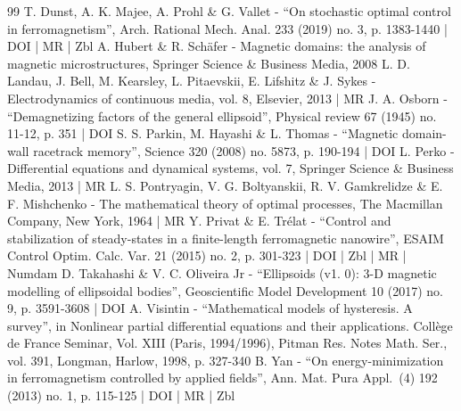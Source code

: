 \begin{thebibliography}{99}
T. Dunst, A. K. Majee, A. Prohl \& G. Vallet - “On stochastic optimal control in ferromagnetism”, Arch. Rational Mech. Anal. 233 (2019) no. 3, p. 1383-1440 | DOI | MR | Zbl
A. Hubert \& R. Schäfer - Magnetic domains: the analysis of magnetic microstructures, Springer Science \& Business Media, 2008
L. D. Landau, J. Bell, M. Kearsley, L. Pitaevskii, E. Lifshitz \& J. Sykes - Electrodynamics of continuous media, vol. 8, Elsevier, 2013 | MR
J. A. Osborn - “Demagnetizing factors of the general ellipsoid”, Physical review 67 (1945) no. 11-12, p. 351 | DOI
S. S. Parkin, M. Hayashi \& L. Thomas - “Magnetic domain-wall racetrack memory”, Science 320 (2008) no. 5873, p. 190-194 | DOI
L. Perko - Differential equations and dynamical systems, vol. 7, Springer Science \& Business Media, 2013 | MR
L. S. Pontryagin, V. G. Boltyanskii, R. V. Gamkrelidze \& E. F. Mishchenko - The mathematical theory of optimal processes, The Macmillan Company, New York, 1964 | MR
Y. Privat \& E. Trélat - “Control and stabilization of steady-states in a finite-length ferromagnetic nanowire”, ESAIM Control Optim. Calc. Var. 21 (2015) no. 2, p. 301-323 | DOI | Zbl | MR | Numdam
D. Takahashi \& V. C. Oliveira Jr - “Ellipsoids (v1. 0): 3-D magnetic modelling of ellipsoidal bodies”, Geoscientific Model Development 10 (2017) no. 9, p. 3591-3608 | DOI
A. Visintin - “Mathematical models of hysteresis. A survey”, in Nonlinear partial differential equations and their applications. Collège de France Seminar, Vol. XIII (Paris, 1994/1996), Pitman Res. Notes Math. Ser., vol. 391, Longman, Harlow, 1998, p. 327-340
B. Yan - “On energy-minimization in ferromagnetism controlled by applied fields”, Ann. Mat. Pura Appl. (4) 192 (2013) no. 1, p. 115-125 | DOI | MR | Zbl
\end{thebibliography}
